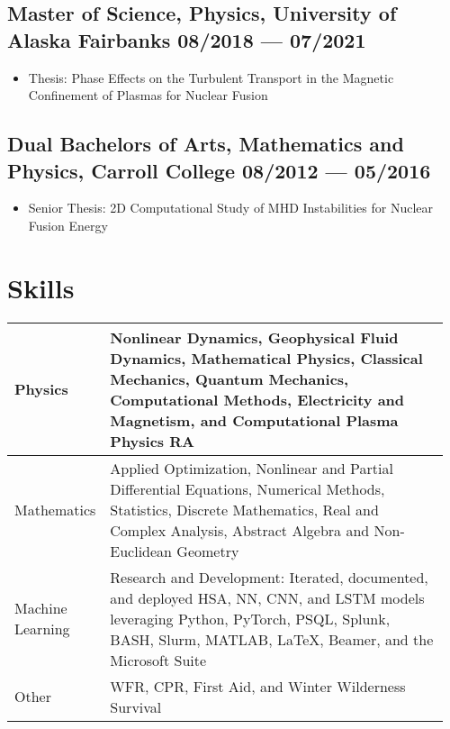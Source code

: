 \documentclass[letterpaper,11pt]{article}
\begin{document}
\subsection*{{\color{cvblue}Master of Science, Physics,} {University of Alaska Fairbanks} \hfill 08/2018 --- 07/2021} %

\begin{itemize}
    \setlength{\itemsep}{-.5pt}
\item Thesis: Phase Effects on the Turbulent Transport in the Magnetic Confinement of Plasmas for Nuclear Fusion
\end{itemize}
\subsection*{{\color{cvblue}Dual Bachelors of Arts, Mathematics and Physics,} {Carroll College} \hfill 08/2012 --- 05/2016} %

\begin{itemize}
    \setlength{\itemsep}{-.5pt}
\item Senior Thesis: 2D Computational Study of MHD Instabilities for Nuclear Fusion Energy
\end{itemize}

\section{\color{cvblue}Skills}
\vspace{-.25in}
\begin{table}[h!]
    \setlength{\tabcolsep}{8pt}
    \renewcommand{\arraystretch}{2}
    \centering
    \begin{tabular}{p{0.16\linewidth} || p{0.8\linewidth}}
        Physics& Nonlinear Dynamics, Geophysical Fluid Dynamics, Mathematical Physics, Classical Mechanics,
        Quantum Mechanics, Computational Methods, Electricity and Magnetism, and Computational Plasma Physics RA \\\hline
        Mathematics& Applied Optimization, Nonlinear and Partial Differential Equations, Numerical Methods, Statistics, Discrete Mathematics, Real and Complex Analysis, Abstract Algebra and Non-Euclidean Geometry \\\hline
        Machine Learning & Research and Development: Iterated, documented, and deployed HSA, NN, CNN, and LSTM models leveraging Python, PyTorch, PSQL, Splunk, BASH, Slurm, MATLAB, \LaTeX,  Beamer, and the Microsoft Suite \\\hline
        Other& WFR, CPR, First Aid, and Winter Wilderness Survival\\\hline
    \end{tabular}
\end{table}
\end{document}
